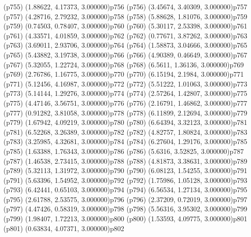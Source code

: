 \psdot(p755)
\psPoint(1.88622, 4.17373, 3.000000){p756}
\psdot(p756)
\psPoint(3.45674, 3.40309, 3.000000){p757}
\psdot(p757)
\psPoint(4.28716, 2.79232, 3.000000){p758}
\psdot(p758)
\psPoint(5.88628, 1.81076, 3.000000){p759}
\psdot(p759)
\psPoint(0.74503, 0.78407, 3.000000){p760}
\psdot(p760)
\psPoint(5.30117, 2.53398, 3.000000){p761}
\psdot(p761)
\psPoint(4.33571, 4.01859, 3.000000){p762}
\psdot(p762)
\psPoint(0.77671, 3.87262, 3.000000){p763}
\psdot(p763)
\psPoint(3.69011, 2.93706, 3.000000){p764}
\psdot(p764)
\psPoint(1.58873, 3.04666, 3.000000){p765}
\psdot(p765)
\psPoint(5.43882, 3.19738, 3.000000){p766}
\psdot(p766)
\psPoint(4.90389, 0.46649, 3.000000){p767}
\psdot(p767)
\psPoint(5.32055, 1.22724, 3.000000){p768}
\psdot(p768)
\psPoint(6.5611, 1.36136, 3.000000){p769}
\psdot(p769)
\psPoint(2.76786, 1.16775, 3.000000){p770}
\psdot(p770)
\psPoint(6.15194, 2.1984, 3.000000){p771}
\psdot(p771)
\psPoint(5.12456, 4.16987, 3.000000){p772}
\psdot(p772)
\psPoint(5.51222, 1.01063, 3.000000){p773}
\psdot(p773)
\psPoint(5.14144, 1.29276, 3.000000){p774}
\psdot(p774)
\psPoint(2.57264, 1.42807, 3.000000){p775}
\psdot(p775)
\psPoint(4.47146, 3.56751, 3.000000){p776}
\psdot(p776)
\psPoint(2.16791, 1.46862, 3.000000){p777}
\psdot(p777)
\psPoint(0.91282, 3.81058, 3.000000){p778}
\psdot(p778)
\psPoint(6.11899, 2.12694, 3.000000){p779}
\psdot(p779)
\psPoint(1.67942, 4.09219, 3.000000){p780}
\psdot(p780)
\psPoint(6.64394, 3.32123, 3.000000){p781}
\psdot(p781)
\psPoint(6.52268, 3.26389, 3.000000){p782}
\psdot(p782)
\psPoint(4.82757, 1.80824, 3.000000){p783}
\psdot(p783)
\psPoint(3.25985, 4.32681, 3.000000){p784}
\psdot(p784)
\psPoint(6.27604, 1.29176, 3.000000){p785}
\psdot(p785)
\psPoint(1.63388, 1.76343, 3.000000){p786}
\psdot(p786)
\psPoint(5.6316, 3.52825, 3.000000){p787}
\psdot(p787)
\psPoint(1.46538, 2.73415, 3.000000){p788}
\psdot(p788)
\psPoint(4.81873, 3.38631, 3.000000){p789}
\psdot(p789)
\psPoint(5.32113, 1.31972, 3.000000){p790}
\psdot(p790)
\psPoint(6.08123, 1.54255, 3.000000){p791}
\psdot(p791)
\psPoint(5.63396, 1.54952, 3.000000){p792}
\psdot(p792)
\psPoint(1.75986, 1.05128, 3.000000){p793}
\psdot(p793)
\psPoint(6.42441, 0.65103, 3.000000){p794}
\psdot(p794)
\psPoint(6.56534, 1.27134, 3.000000){p795}
\psdot(p795)
\psPoint(2.61788, 2.53575, 3.000000){p796}
\psdot(p796)
\psPoint(2.37209, 0.72019, 3.000000){p797}
\psdot(p797)
\psPoint(4.47426, 0.58319, 3.000000){p798}
\psdot(p798)
\psPoint(5.56316, 3.95302, 3.000000){p799}
\psdot(p799)
\psPoint(1.98407, 1.72213, 3.000000){p800}
\psdot(p800)
\psPoint(1.53593, 4.09775, 3.000000){p801}
\psdot(p801)
\psPoint(0.63834, 4.07371, 3.000000){p802}
